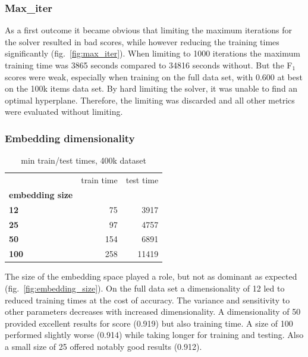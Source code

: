 \documentclass[11pt,a4paper]{article}
\begin{document}
\subsubsection{Max\_iter}

As a first outcome it became obvious that limiting the maximum iterations for the solver resulted in bad scores, while however reducing the training times significantly (fig.~\ref{fig:max_iter}). When limiting to 1000 iterations the maximum training time was 3865 seconds compared to 34816 seconds without. But the F$_1$ scores were weak, especially when training on the full data set, with 0.600 at best on the 100k items data set. By hard limiting the solver, it was unable to find an optimal hyperplane. Therefore, the limiting was discarded and all other metrics were evaluated without limiting.

\subsubsection{Embedding dimensionality}


\begin{table}[htbp]
	\caption{min train/test times, 400k dataset}
	\label{tab:embedding_size}
	\centering
	\begin{tabular}{lrr}
	\toprule
	{} &  train time &     test time \\
	\textbf{embedding size} &             &               \\
	\midrule
	\textbf{12            } &   75 &   3917 \\
	\textbf{25            } &   97 &   4757 \\
	\textbf{50            } &  154 &   6891 \\
	\textbf{100           } &  258 &  11419 \\
	\bottomrule
	\end{tabular}
\end{table}

The size of the embedding space played a role, but not as dominant as expected (fig.~\ref{fig:embedding_size}). On the full data set a dimensionality of 12 led to reduced training times at the cost of accuracy. The variance and sensitivity to other parameters decreases with increased dimensionality. A dimensionality of 50 provided excellent results for score (0.919) but also training time. A size of 100 performed slightly worse (0.914) while taking longer for training and testing. Also a small size of 25 offered notably good results (0.912).
\end{document}
